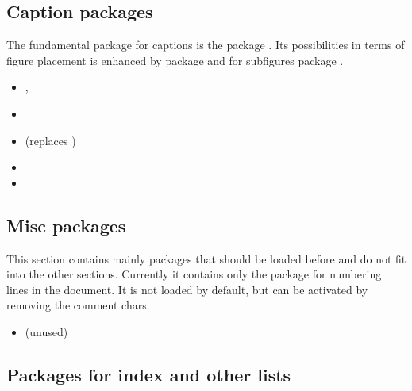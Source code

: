 
\subsection{Caption packages}
\label{sec:packages:caption}

The fundamental package for captions is the package .  Its possibilities in terms of figure placement is enhanced by package  and for subfigures package .

\begin{itemize}[noitemsep]
\item {}, 
\item {}
\item {} (replaces )
\item {}
\item {}
\end{itemize}


\subsection{Misc packages}
\label{sec:packages:misc}
This section contains mainly packages that should be loaded before  and do not fit into the other sections.
Currently it contains only the package  for numbering lines
in the document. It is not loaded by default, but can be activated by removing the comment chars.

\begin{itemize}[noitemsep]
\item {} (unused)
\end{itemize}


\subsection{Packages for index and other lists}
\label{sec:packages:index}

